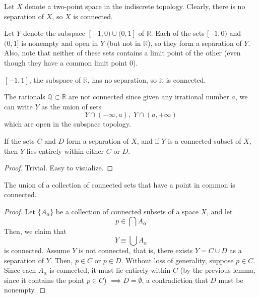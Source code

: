 \documentclass{article}
\begin{document}
    \begin{example}
    Let $X$ denote a two-point space in the indiscrete topology. Clearly, there is no separation of $X$, so $X$ is connected. 
    \end{example}

    \begin{example}
    Let $Y$ denote the subspace $[-1,0) \cup (0,1]$ of $\mathbb{R}$. Each of the sets $[-1,0)$ and $(0,1]$ is nonempty and open in $Y$ (but not in $\mathbb{R}$), so they form a separation of $Y$. Also, note that neither of these sets contains a limit point of the other (even though they have a common limit point $0$). 
    \end{example}

    \begin{example}
    $[-1,1]$, the subspace of $\mathbb{R}$, has no separation, so it is connected. 
    \end{example}

    \begin{example}
    The rationals $\mathbb{Q} \subset \mathbb{R}$ are not connected since given any irrational number $a$, we can write $Y$ as the union of sets
    \[Y \cap (-\infty, a), \; Y \cap (a, +\infty)\]
    which are open in the subspace topology. 
    \end{example}

    \begin{lemma}
    If the sets $C$ and $D$ form a separation of $X$, and if $Y$ is a connected subset of $X$, then $Y$ lies entirely within either $C$ or $D$. 
    \end{lemma}
    \begin{proof}
    Trivial. Easy to visualize. 
    \end{proof}

    \begin{theorem}
    The union of a collection of connected sets that have a point in common is connected. 
    \end{theorem}
    \begin{center}
    \end{center}

    \begin{proof}
    Let $\{A_\alpha\}$ be a collection of connected subsets of a space $X$, and let 
    \[p \in \bigcap A_\alpha\]
    Then, we claim that 
    \[Y \equiv \bigcup A_\alpha\]
    is connected. Assume $Y$ is not connected, that is, there exists $Y = C \cup D$ as a separation of $Y$. Then, $p \in C$ or $p \in D$. Without loss of generality, suppose $p \in C$. Since each $A_\alpha$ is connected, it must lie entirely within $C$ (by the previous lemma, since it contains the point $p \in C$) $\implies D = \emptyset$, a contradiction that $D$ must be nonempty. 
    \end{proof}
\end{document}
